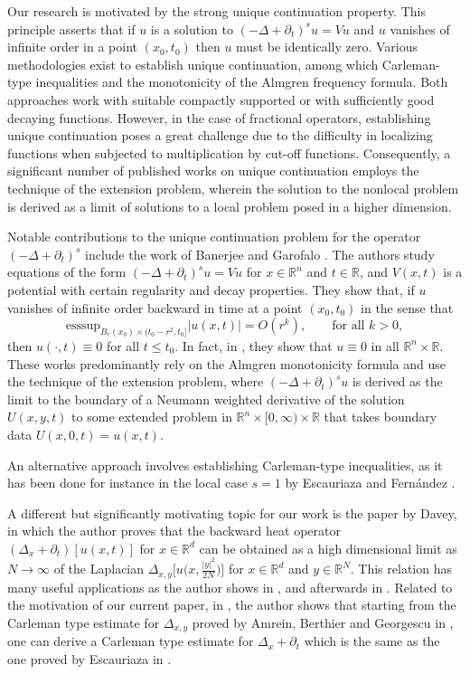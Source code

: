 \documentclass[11pt, twoside, notitlepage]{amsart}
\newcommand\R{\mathbb{R}}
\numberwithin{equation}{section}
\begin{document}
Our research is motivated by the strong unique continuation property. This principle asserts that if
$u$ is a solution to  $(-\Delta+\partial_t)^s u=Vu$ and  $u$ vanishes of infinite order in a point $(x_0,t_0)$ then $u$ must be identically zero.
Various methodologies exist to establish unique continuation, among which Carleman-type inequalities and the monotonicity of the Almgren frequency formula. Both approaches work with suitable compactly supported or with sufficiently good decaying functions. However, in the case of fractional operators, establishing unique continuation poses a great challenge due to the  difficulty in localizing functions when subjected to multiplication by cut-off functions. Consequently, a significant number of published works on unique continuation employs the technique of the extension problem, wherein the solution to the nonlocal problem is derived as a limit of solutions to a local problem posed in a higher dimension.

Notable contributions to the unique continuation problem for the operator  $(-\Delta+\partial_t)^s$ include the work of Banerjee and  Garofalo \cite{BanerjeeGarofalo}. The authors study equations of the form $(-\Delta+\partial_t)^s u=Vu$ for $x\in \R^n $ and $t\in \R$, and $V(x,t)$ is a potential with certain regularity and decay properties.
They show that, if $u$ vanishes of infinite order backward in time at a point $(x_0,t_0)$  in the sense that
$$
  \text{esssup}_{B_r(x_0) \times (t_0-r^2, t_0]} |u(x,t)| = O(r^k), \qquad \text{for all } k>0,
$$
 then $u(\cdot, t) \equiv 0$ for all $t\le t_0$. In fact, in \cite{BanerjeeGarofalo2}, they show that $u\equiv 0$ in all $\R^n  \times \R.$
 These works predominantly rely on the Almgren monotonicity formula and use the technique of the extension problem, where $(-\Delta+\partial_t)^s u$ is derived as the limit to the boundary of a Neumann weighted derivative of the solution $U(x,y,t)$ to some extended problem in $\R^n \times [0,\infty) \times \R$ that takes boundary data $U(x,0,t)=u(x,t)$.

An alternative approach involves establishing Carleman-type inequalities, as it has been done for instance in the local case $s=1$ by Escauriaza \cite{EscauriazaDuke2000} and Fern\'andez  \cite{FernandezCPDEs2003}.



A different  but significantly motivating topic for our work is the  paper \cite{DaveyARMA2018} by Davey, in which the author proves that the backward heat operator $(\Delta_x+\partial_t)[u(x,t)]$  for $x\in \R^d$ can be obtained as a high dimensional limit as $N\to \infty$ of the Laplacian $\Delta_{x,y} \Big[u\big(x,\frac{|y|^2}{2N}\big) \Big]$ for $x\in \R^d $ and $y\in \R^N$.  This relation has many useful applications as the author shows in \cite{DaveyARMA2018}, and afterwards in \cite{DaveyGarcia}. Related to the motivation of our current paper, in \cite{DaveyARMA2018}, the author shows that starting from the Carleman type estimate for $\Delta_{x,y}$ proved by Amrein, Berthier and Georgescu in \cite{Amrein}, one can derive a Carleman type estimate for $\Delta_x+\partial_t$ which is the same as the one proved by Escauriaza in \cite{EscauriazaDuke2000}.
\end{document}
